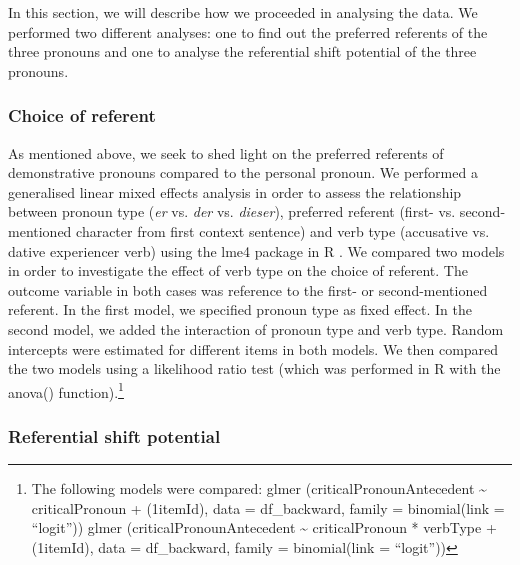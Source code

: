 \documentclass[output=paper,colorlinks,citecolor=brown]{langscibook}
\begin{document}
In this section, we will describe how we proceeded in analysing the data. We performed two different analyses: one to find out the preferred referents of the three pronouns and one to analyse the referential shift potential of the three pronouns.

\subsubsection{Choice of referent}\label{sec:fuchs:2.4.1}

As mentioned above, we seek to shed light on the preferred referents of demonstrative pronouns compared to the personal pronoun. We performed a generalised linear mixed effects analysis in order to assess the relationship between pronoun type (\textit{er} vs. \textit{der} vs. \textit{dieser}), preferred referent (first- vs. second-mentioned character from first context sentence) and verb type (accusative vs. dative experiencer verb) using the lme4 package \citep{BatesEtAl2015} in R \citep{RCoreTeam2017}. We compared two models in order to investigate the effect of verb type on the choice of referent. The outcome variable in both cases was reference to the first- or second-mentioned referent. In the first model, we specified pronoun type as fixed effect. In the second model, we added the interaction of pronoun type and verb type. Random intercepts were estimated for different items in both models. We then compared the two models using a likelihood ratio test (which was performed in R with the anova() function).\footnote{The following models were compared: \newline glmer (criticalPronounAntecedent {\textasciitilde} criticalPronoun + (1{\textbar}itemId), data = df\_backward, family = binomial(link = “logit”)) \newline glmer (criticalPronounAntecedent {\textasciitilde} criticalPronoun * verbType + (1{\textbar}itemId), data = df\_backward, family = binomial(link = “logit”))}

\subsubsection{Referential shift potential}\label{sec:fuchs:2.4.2}
\end{document}
